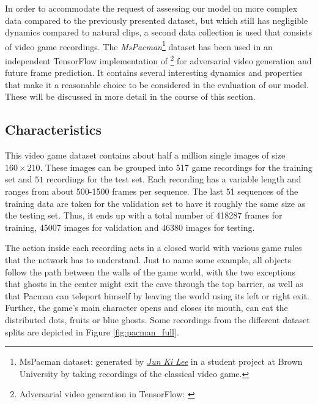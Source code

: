 In order to accommodate the request of assessing our model on more complex data compared to the previously presented dataset, but which still has negligible dynamics compared to natural clips, a second data collection is used that consists of video game recordings. The \textit{MsPacman}\footnote{MsPacman dataset: generated by \href{mailto:jun_ki_lee@brown.edu}{\textit{Jun Ki Lee}} in a student project at Brown University by taking recordings of the classical video game.} dataset has been used in an independent TensorFlow implementation of \parencite{deep_multiscale_video_pred}\footnote{Adversarial video generation in TensorFlow: \parencite{tf_impl_gan}} for adversarial video generation and future frame prediction. It contains several interesting dynamics and properties that make it a reasonable choice to be considered in the evaluation of our model. These will be discussed in more detail in the course of this section.

\subsection{Characteristics}

This video game dataset contains about half a million single images of size $ 160 \times 210 $. These images can be grouped into \num{517} game recordings for the training set and $51$ recordings for the test set. Each recording has a variable length and ranges from about \num{500}-\num{1500} frames per sequence. The last \num{51} sequences of the training data are taken for the validation set to have it roughly the same size as the testing set. Thus, it ends up with a total number of \num{418287} frames for training, \num{45007} images for validation and \num{46380} images for testing.

The action inside each recording acts in a closed world with various game rules that the network has to understand. Just to name some example, all objects follow the path between the walls of the game world, with the two exceptions that ghosts in the center might exit the cave through the top barrier, as well as that Pacman can teleport himself by leaving the world using its left or right exit. Further, the game's main character opens and closes its mouth, can eat the distributed dots, fruits or blue ghosts. Some recordings from the different dataset splits are depicted in Figure \ref{fig:pacman_full}.

